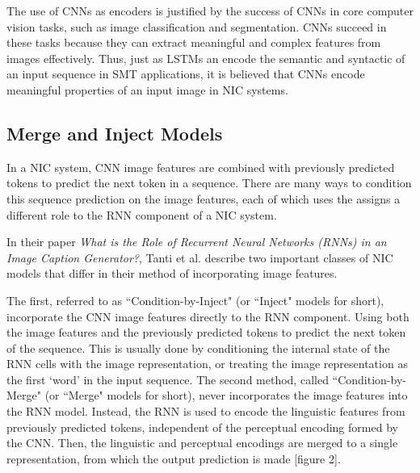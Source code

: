 \documentclass[letterpaper, 10 pt, conference]{ieeeconf}
\begin{document}
The use of CNNs as encoders is justified by the success of CNNs in core computer vision tasks, such as image classification and segmentation. CNNs succeed in these tasks because they can extract meaningful and complex features from images effectively. Thus, just as LSTMs an encode the semantic and syntactic of an input sequence in SMT applications, it is believed that CNNs encode meaningful properties of an input image in NIC systems.

\subsection{Merge and Inject Models}

In a NIC system, CNN image features are combined with previously predicted tokens to predict the next token in a sequence. There are many ways to condition this sequence prediction on the image features, each of which uses the assigns a different role to the RNN component of a NIC system. 

In their paper \emph{What is the Role of Recurrent Neural Networks (RNNs) in an Image Caption Generator?}, 
Tanti et al. describe two important classes of NIC models that differ in their method of incorporating image features. 

The first, referred to as ``Condition-by-Inject" (or ``Inject" models for short), incorporate the CNN image features directly to the RNN component. Using both the image features and the previously predicted tokens to predict the next token of the sequence. This is usually done by conditioning the internal state of the RNN cells with the image representation, or treating the image representation as the first `word' in the input sequence. The second method, called ``Condition-by-Merge" (or ``Merge" models for short), never incorporates the image features into the RNN model. Instead, the RNN is used to encode the linguistic features from previously predicted tokens, independent of the perceptual encoding formed by the CNN. Then, the linguistic and perceptual encodings are merged to a single representation, from which the output prediction is made [figure 2]. 
\end{document}
